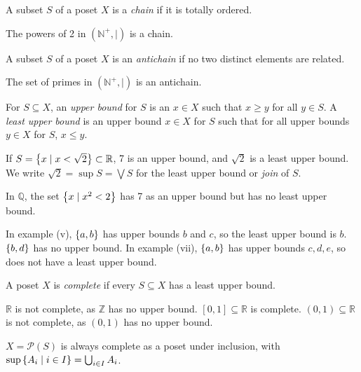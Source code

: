 \begin{definition}
    A subset \( S \) of a poset \( X \) is a \emph{chain} if it is totally ordered.
\end{definition}
\begin{example}
    The powers of 2 in \( (\mathbb N^+, \mid) \) is a chain.
\end{example}
\begin{definition}
    A subset \( S \) of a poset \( X \) is an \emph{antichain} if no two distinct elements are related.
\end{definition}
\begin{example}
    The set of primes in \( (\mathbb N^+, \mid) \) is an antichain.
\end{example}
\begin{definition}
    For \( S \subseteq X \), an \emph{upper bound} for \( S \) is an \( x \in X \) such that \( x \geq y \) for all \( y \in S \).
    A \emph{least upper bound} is an upper bound \( x \in X \) for \( S \) such that for all upper bounds \( y \in X \) for \( S \), \( x \leq y \).
\end{definition}
\begin{example}
    If \( S = \qty{x \mid x < \sqrt{2}} \subset \mathbb R \), 7 is an upper bound, and \( \sqrt{2} \) is a least upper bound.
    We write \( \sqrt{2} = \sup S = \bigvee S \) for the least upper bound or \emph{join} of \( S \).

    In \( \mathbb Q \), the set \( \qty{x \mid x^2 < 2} \) has 7 as an upper bound but has no least upper bound.

    In example (v), \( \qty{a, b} \) has upper bounds \( b \) and \( c \), so the least upper bound is \( b \).
    \( \qty{b, d} \) has no upper bound.
    In example (vii), \( \qty{a, b} \) has upper bounds \( c, d, e \), so does not have a least upper bound.
\end{example}
\begin{definition}
    A poset \( X \) is \emph{complete} if every \( S \subseteq X \) has a least upper bound.
\end{definition}
\begin{example}
    \( \mathbb R \) is not complete, as \( \mathbb Z \) has no upper bound.
    \( [0,1] \subseteq \mathbb R \) is complete.
    \( (0,1) \subseteq \mathbb R \) is not complete, as \( (0,1) \) has no upper bound.
\end{example}
\begin{example}
    \( X = \mathcal P(S) \) is always complete as a poset under inclusion, with \( \sup\qty{A_i \mid i \in I} = \bigcup_{i \in I} A_i \).
\end{example}
